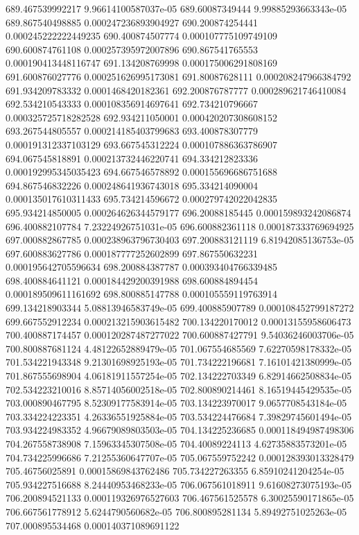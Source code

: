 {689.467539992217 9.96614100587037e-05
689.60087349444 9.99885293663343e-05
689.867540498885 0.000247236893904927
690.200874254441 0.000245222222449235
690.400874507774 0.000107775109749109
690.600874761108 0.000257395972007896
690.867541765553 0.000190413448116747
691.134208769998 0.000175006291808169
691.600876027776 0.000251626995173081
691.80087628111 0.000208247966384792
691.934209783332 0.0001468420182361
692.200876787777 0.000289621746410084
692.534210543333 0.000108356914697641
692.734210796667 0.000325725718282528
692.934211050001 0.000420207308608152
693.267544805557 0.000214185403799683
693.400878307779 0.000191312337103129
693.667545312224 0.000107886363786907
694.067545818891 0.000213732446220741
694.334212823336 0.000192995345035423
694.667546578892 0.000155696686751688
694.867546832226 0.000248641936743018
695.334214090004 0.000135017610311433
695.734214596672 0.000279742022042835
695.934214850005 0.000264626344579177
696.20088185445 0.000159893242086874
696.400882107784 7.23224926751031e-05
696.600882361118 0.000187333769694925
697.000882867785 0.000238963796730403
697.200883121119 6.81942085136753e-05
697.600883627786 0.000187777252602899
697.867550632231 0.000195642705596634
698.200884387787 0.000393404766339485
698.400884641121 0.000184429200391988
698.600884894454 0.000189509611161692
698.800885147788 0.000105559119763914
699.134218903344 5.08813946583749e-05
699.400885907789 0.000108452799187272
699.667552912234 0.000213215903615482
700.134220170012 0.00013155958606473
700.400887174457 0.000120287487277022
700.600887427791 9.54036246003706e-05
700.800887681124 4.48122652889479e-05
701.067554685569 7.62270598178332e-05
701.534221943348 9.21301698925193e-05
701.734222196681 7.16101421380999e-05
701.867555698904 4.06181911557254e-05
702.134222703349 6.82914662508834e-05
702.534223210016 8.85714056002518e-05
702.800890214461 8.16519445429535e-05
703.000890467795 8.52309177583914e-05
703.134223970017 9.0657708543184e-05
703.334224223351 4.26336551925884e-05
703.534224476684 7.39829745601494e-05
703.934224983352 4.96679089803503e-05
704.134225236685 0.000118494987498306
704.267558738908 7.15963345307508e-05
704.40089224113 4.62735883573201e-05
704.734225996686 7.21255360647707e-05
705.067559752242 0.000128393013328479
705.46756025891 0.00015869843762486
705.734227263355 6.85910241204254e-05
705.934227516688 8.24440953468233e-05
706.067561018911 9.61608273075193e-05
706.200894521133 0.000119326976527603
706.467561525578 6.30025590171865e-05
706.667561778912 5.6244790560682e-05
706.800895281134 5.89492751025263e-05
707.000895534468 0.000140371089691122
}
